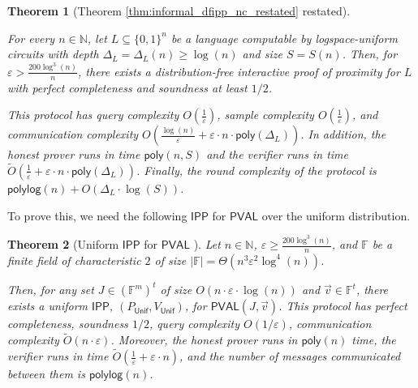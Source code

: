 \documentclass[11pt]{article}
\newtheorem{theorem}{Theorem}[section]
\newcommand{\poly}{\mathsf{poly}}
\newcommand{\polylog}{\mathsf{polylog}}
\newcommand{\PVAL}{\mathsf{PVAL}}
\newcommand{\IPP}{\mathsf{IPP}}
\newcommand{\F}{\mathbb{F}}
\newcommand{\N}{\mathbb{N}}
\begin{document}
\begin{theorem}[Theorem \ref{thm:informal_dfipp_nc_restated} restated]
\label{thm:simplerncdfippsizedepth}

For every $n \in \N$, let $L \subseteq \{0,1\}^{n}$ be a language computable by logspace-uniform  circuits with depth $\Delta_{L}=\Delta_{L}(n)\geq \log (n)$ and size $S=S(n)$. Then, for  $\varepsilon > \frac{200\log^{3}(n)}{n}$, there exists a distribution-free interactive proof of proximity for $L$ with perfect completeness and soundness at least $1/2$. 

This protocol has query complexity $O\left( \frac{1}{\varepsilon} \right)$, sample complexity $O\left( \frac{1}{\varepsilon} \right)$, and communication complexity $O\left(\frac{\log(n)}{\varepsilon} +\varepsilon\cdot n\cdot \poly(\Delta_{L})\right)$. In addition, the honest prover runs in time $\poly(n,S)$ and the verifier runs in time $\tilde{O}\left( \frac{1}{\varepsilon}+\varepsilon\cdot n\cdot\poly(\Delta_{L}) \right)$. Finally, the round complexity of the protocol is $\polylog(n)+O(\Delta_{L}\cdot\log (S))$.
\end{theorem}

\noindent To prove this, we need the following $\IPP$ for $\PVAL$ over the uniform distribution.
\begin{theorem}[Uniform $\IPP$ for $\PVAL$ \cite{RR20_batch_polylog}]
\label{thm:uniform_ipp_pval_rvw}
    Let $n\in \N$, $\varepsilon \geq \frac{200\log^{3}(n)}{n}$, and $\F$ be a finite field of characteristic $2$ of size $|\F|=\Theta(n^{3}\varepsilon^{2}\log^{4}(n))$.
    
    Then, for any set $J\in (\F^{m})^{t}$ of size $O(n\cdot \varepsilon\cdot \log (n))$ and $\vec{v}\in \F^{t}$, there exists a uniform $\IPP$, $(P_{\mathsf{Unif}}, V_{\mathsf{Unif}})$, for $\PVAL(J,\vec{v})$. This protocol has perfect completeness, soundness $1/2$, query complexity $O(1/\varepsilon)$, communication complexity $\tilde{O}(n\cdot \varepsilon)$. Moreover, the honest prover runs in $\poly(n)$ time, the verifier runs in time $\tilde{O}\left(\frac{1}{\varepsilon}+\varepsilon\cdot n\right)$, and the number of messages communicated between them is $\polylog(n)$.
\end{theorem}
\end{document}
